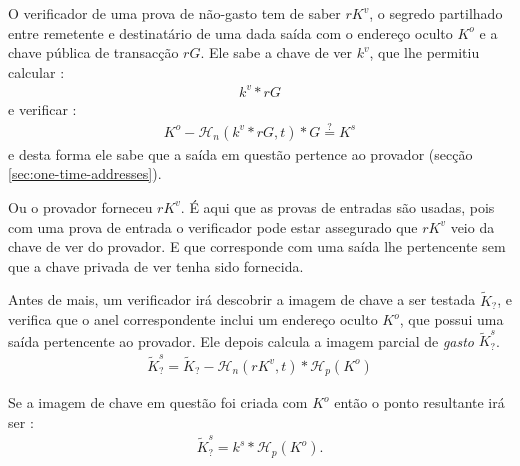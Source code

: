 O verificador de uma prova de não-gasto tem de saber $r K^v$, o segredo partilhado entre remetente e destinatário de uma dada saída com o endereço oculto $K^o$ e a chave pública de transacção $r G$. Ele sabe a chave de ver $k^v$, que lhe permitiu calcular :
\begin{align*}
k^v*r G
\end{align*}
e verificar :
\begin{align*}
K^o - \mathcal{H}_n(k^v*rG,t)*G \stackrel{?}{=} K^s
\end{align*}
e desta forma ele sabe que a saída em questão pertence ao provador (secção \ref{sec:one-time-addresses}).

Ou o provador forneceu $r K^v$. É aqui que as provas de entradas são usadas, pois com uma prova de entrada o verificador pode estar assegurado que $r K^v$ veio da chave de ver do provador. E que corresponde com uma saída lhe pertencente sem que a chave privada de ver tenha sido fornecida.

Antes de mais, um verificador irá descobrir a imagem de chave a ser testada $\tilde{K}_?$, e verifica que o anel correspondente inclui um endereço oculto $K^o$, que possui uma saída pertencente ao provador. Ele depois calcula a imagem parcial de {\em gasto} $\tilde{K}^s_?$.
\begin{align*}
\tilde{K}^s_? = \tilde{K}_? - \mathcal{H}_n(r K^v,t)*\mathcal{H}_p(K^o)
\end{align*}

Se a imagem de chave em questão foi criada com $K^o$ então o ponto resultante irá ser :
\begin{align*}
\tilde{K}^s_? = k^s*\mathcal{H}_p(K^o).
\end{align*}

